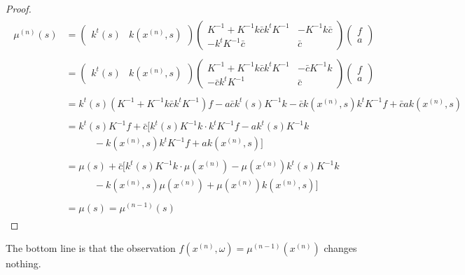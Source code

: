 \documentclass[paper=a4, fontsize=11pt]{scrartcl} %
\numberwithin{equation}{section} %
\numberwithin{figure}{section} %
\numberwithin{table}{section} %
\newcommand{\xn}{x^{(n)}}
\newcommand{\kinv}{K^{-1}} %
\begin{document}
\begin{proof}
\begin{align}
 \begin{split}
%
\mu^{(n)}(s) &= \left( \begin{array}{cc}
 k^t(s)  & k(\xn, s)  
\end{array} \right)
%
%
\left( \begin{array}{cc}
\kinv + \kinv k \bar{c} k^t \kinv  &  -\kinv k \bar{c} \\
-k^t\kinv \bar{c}   &  \bar{c}
 \end{array} \right)
%
%
\left( \begin{array}{cc}
 f  \\ a 
 \end{array} \right) \\\\
%
%
%
%
%
%
%
%
&= \left( \begin{array}{cc}
 k^t(s)  & k(\xn, s)
 \end{array} \right)
%
%
\left( \begin{array}{cc}
\kinv + \kinv k \bar{c} k^t \kinv  &  -\bar{c}\kinv k  \\
-\bar{c}k^t\kinv   & \bar{c}
 \end{array} \right)
%
%
\left( \begin{array}{cc}
 f  \\ a
  \end{array} \right) \\\\
%
%
&=  k^t(s)(\kinv + \kinv k \bar{c}k^t \kinv )f - a\bar{c} k^t(s) \kinv k  -\bar{c} k(\xn,s) k^t\kinv f + \bar{c}a k(\xn,s) \\\\
%
%
&=  k^t(s)\kinv f + \bar{c}[k^t(s)\kinv k\cdot  k^t \kinv f - a k^t(s) \kinv k \\
 &\ \ \ \ \ \ \ \ \ \ \ \ \ - k(\xn, s) k^t\kinv f + a k(\xn,s)] \\\\
%
%
%
&= \mu (s) + \bar{c}[k^t(s)\kinv k\cdot  \mu (\xn) -\mu(\xn) k^t(s) \kinv k \\
 &\ \ \ \ \ \ \ \ \ \ \ \ \ - k(\xn, s) \mu(\xn) + \mu(\xn) k(\xn,s)] \\\\
%
%
%
& = \mu(s) = \mu^{(n-1)} (s)
\end{split}
\end{align}
\end{proof}

The bottom line is that the observation $f( \xn ,\omega) = \mu^{(n-1)}(\xn)$ changes nothing.
\end{document}
